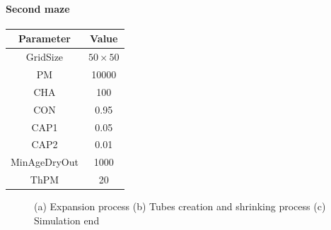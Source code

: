 \paragraph{Second maze}

\begin{center}
 \begin{tabular}{||c c||} 
 \hline
 Parameter & Value \\ [0.5ex] 
 \hline\hline
 GridSize & $50 \times 50$ \\ 
 \hline
 PM & 10000 \\ 
 \hline
 CHA & 100 \\ 
 \hline
 CON & 0.95 \\ 
 \hline
 CAP1 & 0.05 \\ 
 \hline
 CAP2 & 0.01 \\ 
 \hline
 MinAgeDryOut & 1000 \\
 \hline
 ThPM & 20 \\ [1ex] 
 \hline
 \end{tabular}
\end{center}

\begin{figure}[H]
    \centering
    \caption{(a) Expansion process (b) Tubes creation and shrinking process (c) Simulation end}
    \label{fig:foobar}
\end{figure}

